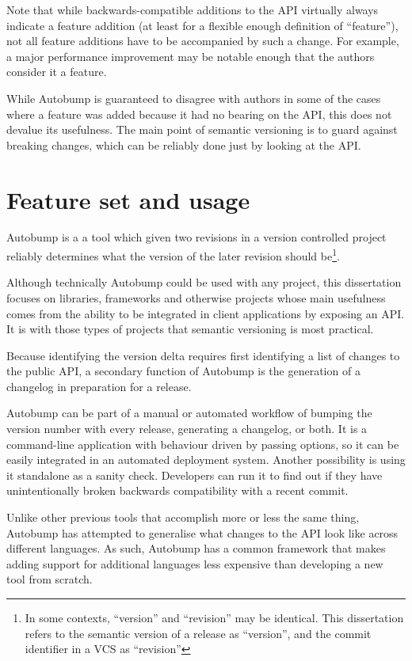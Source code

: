 \documentclass{l4proj}
\begin{document}
Note that while backwards-compatible additions to the API virtually
always indicate a feature addition (at least for a flexible enough
definition of ``feature''), not all feature additions have to be
accompanied by such a change. For example, a major performance
improvement may be notable enough that the authors consider it a
feature.

While Autobump is guaranteed to disagree with authors in some of the
cases where a feature was added because it had no bearing on the API,
this does not devalue its usefulness. The main point of semantic
versioning is to guard against breaking changes, which can be reliably
done just by looking at the API.

\section{Feature set and usage}


Autobump is a a tool which given two revisions in a version
controlled project reliably determines what the version of the later
revision should be\footnote{In some contexts, ``version'' and
``revision'' may be identical. This dissertation refers to the
semantic version of a release as ``version'', and the commit
identifier in a VCS as ``revision''}.

Although technically Autobump could be used with any project, this
dissertation focuses on libraries, frameworks and otherwise projects
whose main usefulness comes from the ability to be integrated in
client applications by exposing an API. It is with those types of
projects that semantic versioning is most practical.

Because identifying the version delta requires first identifying a
list of changes to the public API, a secondary function of Autobump is
the generation of a changelog in preparation for a release.

Autobump can be part of a manual or automated workflow of bumping the
version number with every release, generating a changelog, or both. It
is a command-line application with behaviour driven by passing
options, so it can be easily integrated in an automated deployment
system. Another possibility is using it standalone as a sanity check.
Developers can run it to find out if they have unintentionally broken
backwards compatibility with a recent commit.

Unlike other previous tools that accomplish more or less the same
thing, Autobump has attempted to generalise what changes to the API look
like across different languages. As such, Autobump has a common
framework that makes adding support for additional languages less
expensive than developing a new tool from scratch.
\end{document}
